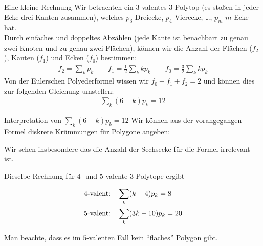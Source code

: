 \documentclass[10pt, notheorems]{beamer}
\begin{document}
\begin{frame}{Eine kleine Rechnung}
  Wir betrachten ein $3$-valentes $3$-Polytop (es stoßen in jeder Ecke drei Kanten zusammen), welches $p_3$ Dreiecke, $p_4$ Vierecke, \dots, $p_m$ $m$-Ecke hat.\\
  \pause
  Durch  einfaches und doppeltes Abzählen (jede Kante ist benachbart zu genau zwei Knoten und zu genau zwei Flächen), können wir die Anzahl der Flächen ($f_2$), Kanten ($f_1$) und Ecken ($f_0$) bestimmen:
  \begin{align*}
    f_2 = \sum_k p_k \qquad f_1 = \tfrac{1}{2}\sum_k k p_k \qquad f_0 = \tfrac{3}{2}\sum_k k p_k
  \end{align*}
  \pause
  Von der {\sc Euler}schen Polyederformel wissen wir $f_0 - f_1 + f_2 = 2$ und können dies zur folgenden Gleichung umstellen:
  \begin{align*}
    \sum_k (6 - k) p_k = 12
  \end{align*}
\end{frame}

\begin{frame}{Interpretation von $\sum_k (6 - k) p_k = 12$}
  Wir können aus der vorangegangen Formel diskrete Krümmungen für Polygone angeben:

  \centering
  
  \pause
  \justifying
  Wir sehen insbesondere das die Anzahl der Sechsecke für die Formel irrelevant ist.
\end{frame}

\begin{frame}
  Dieselbe Rechnung für $4$- und $5$-valente $3$-Polytope ergibt
  \begin{block}{}
  \begin{align*}
    4\text{-valent:\quad}&\sum_k (k-4)p_k = 8\\
    5\text{-valent:\quad}&\sum_k (3k-10)p_k = 20\\
  \end{align*}
  \end{block}
  Man beachte, dass es im $5$-valenten Fall kein ``flaches'' Polygon gibt.
\end{frame}
\end{document}
